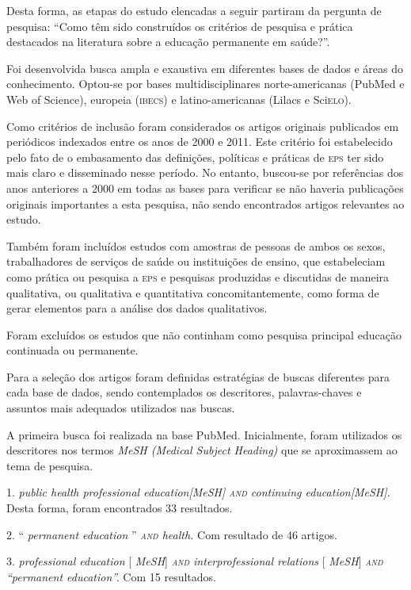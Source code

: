 \documentclass{article}
\begin{document}
Desta forma, as etapas do estudo elencadas a seguir partiram da pergunta de
pesquisa: “Como têm sido construídos os critérios de pesquisa e prática
destacados na literatura sobre a educação permanente em saúde?”.

Foi desenvolvida busca ampla e exaustiva em diferentes bases de dados e áreas do
conhecimento. Optou-se por bases multidisciplinares norte-americanas (PubMed e
Web of Science), europeia (\textsc{ibecs}) e latino-americanas (Lilacs e Sci\textsc{elo}).

Como critérios de inclusão foram considerados os artigos originais publicados em
periódicos indexados entre os anos de 2000 e 2011. Este critério foi
estabelecido pelo fato de o embasamento das definições, políticas e práticas de
\textsc{eps} ter sido mais claro e disseminado nesse período. No entanto, buscou-se por
referências dos anos anteriores a 2000 em todas as bases para verificar se não
haveria publicações originais importantes a esta pesquisa, não sendo encontrados
artigos relevantes ao estudo.

Também foram incluídos estudos com amostras de pessoas de ambos os sexos,
trabalhadores de serviços de saúde ou instituições de ensino, que estabeleciam
como prática ou pesquisa a \textsc{eps} e pesquisas produzidas e discutidas de maneira
qualitativa, ou qualitativa e quantitativa concomitantemente, como forma de
gerar elementos para a análise dos dados qualitativos.

Foram excluídos os estudos que não continham como pesquisa principal educação
continuada ou permanente.

Para a seleção dos artigos foram definidas estratégias de buscas diferentes para
cada base de dados, sendo contemplados os descritores, palavras-chaves e
assuntos mais adequados utilizados nas buscas.

A primeira busca foi realizada na base PubMed. Inicialmente, foram utilizados os
descritores nos termos \textit{MeSH (Medical Subject Heading)}
que se aproximassem ao tema de pesquisa.

1. \textit{public health professional education[MeSH] \textsc{and} continuing
education[MeSH].}
Desta forma, foram encontrados 33 resultados.

2. “ \textit{permanent education}
” \textit{\textsc{and} health.}
Com resultado de 46 artigos.

3. \textit{professional education}
[ \textit{MeSH}] \textit{\textsc{and} interprofessional relations}
[ \textit{MeSH}] \textit{\textsc{and} “permanent education”.}
Com 15 resultados.
\end{document}
